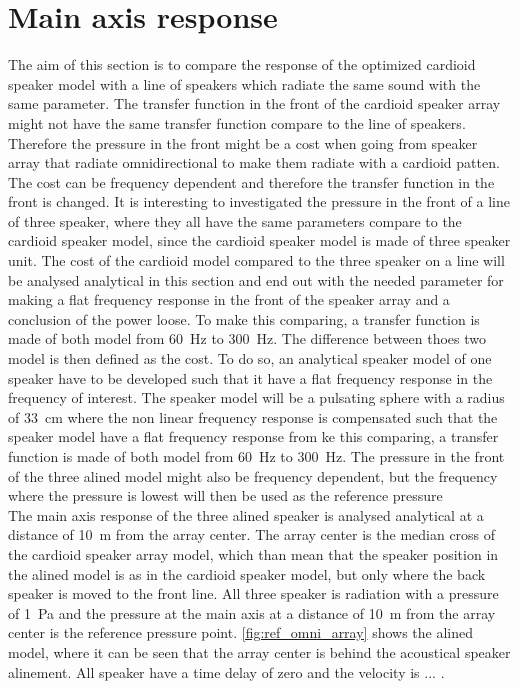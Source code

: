 \section{Main axis response}
The aim of this section is to compare the response of the optimized cardioid speaker model with a line of speakers which radiate the same sound with the same parameter. The transfer function in the front of the cardioid speaker array might not have the same transfer function compare to the line of speakers. Therefore the pressure in the front might be a cost when going from speaker array that radiate omnidirectional to make them radiate with a cardioid patten. The cost can be frequency dependent and therefore the transfer function in the front is changed. It is interesting to investigated the pressure in the front of a line of three speaker, where they all have the same parameters compare to the cardioid speaker model, since the cardioid speaker model is made of three speaker unit. The cost of the cardioid model compared to the three speaker on a line will be analysed analytical in this section and end out with the needed parameter for making a flat frequency response in the front of the speaker array and a conclusion of the power loose. To make this comparing, a transfer function is made of both model from \SI{60}{\hertz} to \SI{300}{\hertz}. The difference between thoes two model is then defined as the cost. To do so, an analytical speaker model of one speaker have to be developed such that it have a flat frequency response in the frequency of interest. The speaker model will be a pulsating sphere with a radius of \SI{33}{\centi\meter} where the non linear frequency response is compensated such that the speaker model have a flat frequency response from  ke this comparing, a transfer function is made of both model from \SI{60}{\hertz} to \SI{300}{\hertz}. The pressure in the front of the three alined model might also be frequency dependent, but the frequency where the pressure is lowest will then be used as the reference pressure \\

The main axis response of the three alined speaker is analysed analytical at a distance of \SI{10}{\meter} from the array center. The array center is the median cross of the cardioid speaker array model, which than mean that the speaker position in the alined model is as in the cardioid speaker model, but only where the back speaker is moved to the front line. All three speaker is radiation with a pressure of \SI{1}{\pascal} and the pressure at the main axis at a distance of \SI{10}{\meter} from the array center is the reference pressure point. \autoref{fig:ref_omni_array} shows the alined model, where it can be seen that the array center is behind the acoustical speaker alinement. All speaker have a time delay of zero and the velocity is ... . 

